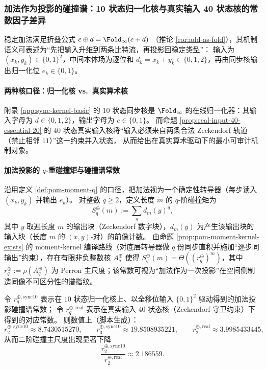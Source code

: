 \subsubsection{加法作为投影的碰撞谱：10 状态归一化核与真实输入 40 状态核的常数因子差异}
\label{app:real-input-40-addition-collision-spectrum}

稳定加法满足折叠公式
\(
c\oplus d=\Fold_\infty(c+d)
\)
（推论 \ref{cor:add-as-fold}），其机制语义可表述为“先把输入升维到两条比特流，再投影回稳定类型”：
输入为 \((x_k,y_k)\in\{0,1\}^2\)，中间本体场为逐位和 \(d_k=x_k+y_k\in\{0,1,2\}\)，再由同步核输出归一化位 \(e_k\in\{0,1\}\)。

\paragraph{两种核口径：归一化核 vs.\ 真实算术核}
附录 \ref{app:sync-kernel-basic} 的 $10$ 状态同步核是 \(\Fold_\infty\) 的在线归一化器：其输入字母为 \(d\in\{0,1,2\}\)，输出字母为 \(e\in\{0,1\}\)。
而命题 \ref{prop:real-input-40-essential-20} 的 \(40\) 状态真实输入核将“输入必须来自两条合法 Zeckendorf 轨道（禁止相邻 \(11\)）”这一约束并入状态，
从而给出在真实算术驱动下的最小可审计机制对象。

\paragraph{加法投影的 \texorpdfstring{$q$}{q}-重碰撞矩与碰撞谱常数}
沿用定义 \ref{def:pom-moment-q} 的口径，把加法视为一个确定性转导器（每步读入 \((x_k,y_k)\) 并输出 \(e_k\)）。
对整数 \(q\ge 2\)，定义长度 \(m\) 的 \(q\)-阶碰撞矩为
\[
S_q^{\oplus}(m):=\sum_{y} d_m(y)^q,
\]
其中 \(y\) 取遍长度 \(m\) 的输出块（Zeckendorf 数字块），\(d_m(y)\) 为产生该输出块的输入块（长度 \(m\) 的 \((x,y)\)-对）的前像计数。
由命题 \ref{prop:pom-moment-kernel-exists} 的 moment-kernel 编译路线（对底层转导器做 \(q\) 份同步直积并施加“逐步同输出”约束），存在有限非负整数核 \(A_q^{\oplus}\) 使得
\(
S_q^{\oplus}(m)=\Theta((r_q^{\oplus})^m)
\)，其中
\(
r_q^{\oplus}:=\rho(A_q^{\oplus})
\)
为 Perron 主尺度；该常数可视为“加法作为一次投影”在空间侧制造同像不可区分性的谱指纹。

\begin{proposition}\label{prop:addition-collision-spectrum-sync10-vs-real40}
令 \(r_q^{\oplus,\mathrm{sync10}}\) 表示在 $10$ 状态归一化核上、以全移位输入 \(\{0,1\}^2\) 驱动得到的加法投影碰撞谱常数；
令 \(r_q^{\oplus,\mathrm{real}}\) 表示在真实输入 \(40\) 状态核（Zeckendorf 守卫约束）下得到的对应常数。
则数值上（脚本生成）：
\[
r_2^{\oplus,\mathrm{sync10}}\approx 8.7430515270,\qquad
r_3^{\oplus,\mathrm{sync10}}\approx 19.8508935221,\qquad
r_2^{\oplus,\mathrm{real}}\approx 3.9985433445,
\]
从而二阶碰撞主尺度出现显著下降
\[
\frac{r_2^{\oplus,\mathrm{sync10}}}{r_2^{\oplus,\mathrm{real}}}\approx 2.186559.
\]
\end{proposition}

